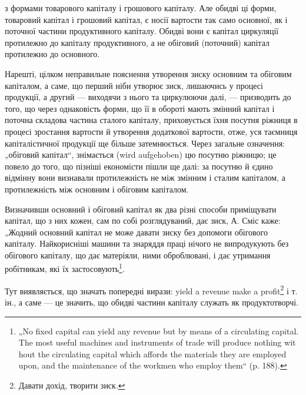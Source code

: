 \parcont{}  %
з формами товарового капіталу і грошового капіталу. Але обидві ці форми,
товаровий капітал і грошовий капітал, є носії вартости так само
основної, як і поточної частини продуктивного капіталу. Обидві вони є
капітал циркуляції протилежно до капіталу продуктивного, а не обіговий
(поточний) капітал протилежно до основного.

Нарешті, цілком неправильне пояснення утворення зиску основним
та обіговим капіталом, а саме, що перший ніби утворює зиск, лишаючись
у процесі продукції, а другий — виходячи з нього та циркулюючи далі, —
призводить до того, що через однаковість форми, що її в обороті
мають змінний капітал і поточна складова частина сталого капіталу, приховується
їхня посутня ріжниця в процесі зростання вартости й
утворення додаткової вартости, отже, уся таємниця капіталістичної продукції
ще більше затемнюється. Через загальне означення: „обіговий капітал“,
знімається (wird aufgehoben) цю посутню ріжницю; це повело до
того, що пізніші економісти пішли ще далі: за посутню й єдино відмінну
вони визнавали протилежність не між змінним і сталим капіталом, а
протилежність між основним і обіговим капіталом.

Визначивши основний і обіговий капітал як два різні способи приміщувати
капітал, що з них кожен, сам по собі розглядуваний, дає зиск,
А. Сміс каже: „Жодний основний капітал не може давати зиску без допомоги
обігового капіталу. Найкорисніші машини та знаряддя праці нічого
не випродукують без обігового капіталу, що дає матеріяли, ними
оброблювані, і дає утримання робітникам, які їх застосовують\footnote*{
„No fixed capital can yield any revenue but by means of a circulating capital.
The most useful machines and instruments of trade will produce nothing wit
hout the circulating capital which affords the materials they are employed upon, and
the maintenance of the workmen who employ them“ (p. 188).
}.

Тут виявляється, що значать попередні вирази: yield a revenue make
a profit\footnote*{
Давати дохід, творити зиск.
} і т. ін., а саме — це значить, що обидві частини капіталу служать
як продуктотворчі.

